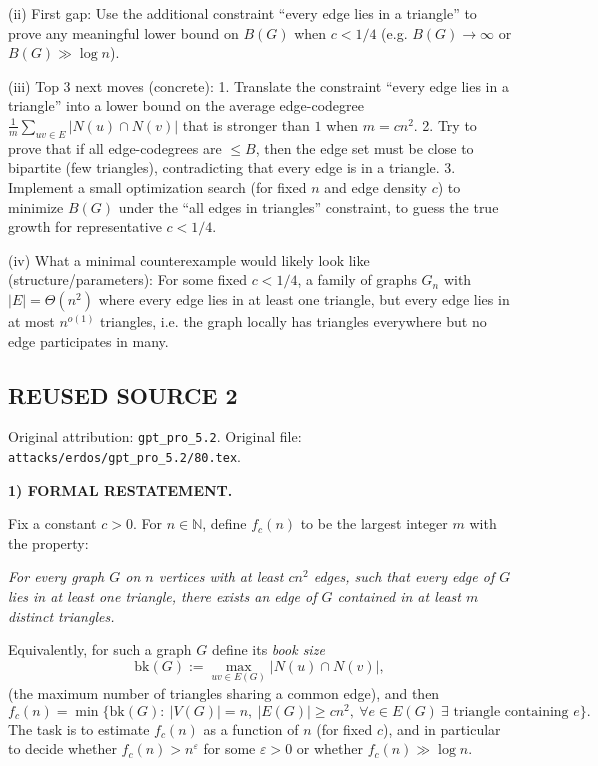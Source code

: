(ii) First gap:
Use the additional constraint ``every edge lies in a triangle'' to prove any meaningful lower bound on $B(G)$ when $c<1/4$ (e.g. $B(G)\to\infty$ or $B(G)\gg\log n$).

(iii) Top 3 next moves (concrete):
1. Translate the constraint ``every edge lies in a triangle'' into a lower bound on the average edge-codegree $\frac{1}{m}\sum_{uv\in E}|N(u)\cap N(v)|$ that is stronger than $1$ when $m=cn^2$.
2. Try to prove that if all edge-codegrees are $\le B$, then the edge set must be close to bipartite (few triangles), contradicting that every edge is in a triangle.
3. Implement a small optimization search (for fixed $n$ and edge density $c$) to minimize $B(G)$ under the ``all edges in triangles'' constraint, to guess the true growth for representative $c<1/4$.

(iv) What a minimal counterexample would likely look like (structure/parameters):
For some fixed $c<1/4$, a family of graphs $G_n$ with $|E|=\Theta(n^2)$ where every edge lies in at least one triangle,
but every edge lies in at most $n^{o(1)}$ triangles, i.e. the graph locally has triangles everywhere but no edge participates in many.



\subsection*{REUSED SOURCE 2}
Original attribution: \texttt{gpt\_pro\_5.2}.
Original file: \texttt{attacks/erdos/gpt\_pro\_5.2/80.tex}.


\noindent\textbf{1) FORMAL RESTATEMENT.}

Fix a constant $c>0$. For $n\in\mathbb{N}$, define $f_c(n)$ to be the largest integer $m$ with the property:

\emph{For every graph $G$ on $n$ vertices with at least $c n^2$ edges, such that every edge of $G$ lies in at least one triangle, there exists an edge of $G$ contained in at least $m$ distinct triangles.}

Equivalently, for such a graph $G$ define its \emph{book size}
\[
\mathrm{bk}(G):=\max_{uv\in E(G)}\bigl|N(u)\cap N(v)\bigr|,
\]
(the maximum number of triangles sharing a common edge), and then
\[
 f_c(n)=\min\{\mathrm{bk}(G):\ |V(G)|=n,\ |E(G)|\ge c n^2,\ \forall e\in E(G)\ \exists\text{ triangle containing }e\}.
\]
The task is to estimate $f_c(n)$ as a function of $n$ (for fixed $c$), and in particular to decide whether $f_c(n)>n^{\varepsilon}$ for some $\varepsilon>0$ or whether $f_c(n)\gg \log n$.


